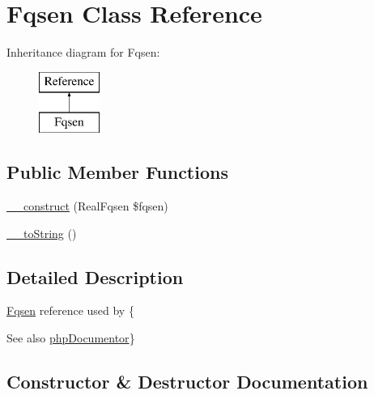\hypertarget{classphp_documentor_1_1_reflection_1_1_doc_block_1_1_tags_1_1_reference_1_1_fqsen}{}\section{Fqsen Class Reference}
\label{classphp_documentor_1_1_reflection_1_1_doc_block_1_1_tags_1_1_reference_1_1_fqsen}
Inheritance diagram for Fqsen\+:\begin{figure}[H]
\begin{center}
\leavevmode
\includegraphics[height=2.000000cm]{classphp_documentor_1_1_reflection_1_1_doc_block_1_1_tags_1_1_reference_1_1_fqsen}
\end{center}
\end{figure}
\subsection*{Public Member Functions}
\begin{DoxyCompactItemize}
\item 
\mbox{\hyperlink{classphp_documentor_1_1_reflection_1_1_doc_block_1_1_tags_1_1_reference_1_1_fqsen_a370f3f39c750420fd588d8aa7270299d}{\+\_\+\+\_\+construct}} (Real\+Fqsen \$fqsen)
\item 
\mbox{\hyperlink{classphp_documentor_1_1_reflection_1_1_doc_block_1_1_tags_1_1_reference_1_1_fqsen_a7516ca30af0db3cdbf9a7739b48ce91d}{\+\_\+\+\_\+to\+String}} ()
\end{DoxyCompactItemize}


\subsection{Detailed Description}
\mbox{\hyperlink{classphp_documentor_1_1_reflection_1_1_doc_block_1_1_tags_1_1_reference_1_1_fqsen}{Fqsen}} reference used by \{\begin{DoxySeeAlso}{See also}
\mbox{\hyperlink{namespacephp_documentor}{php\+Documentor}}\} 
\end{DoxySeeAlso}


\subsection{Constructor \& Destructor Documentation}
\mbox{\label{classphp_documentor_1_1_reflection_1_1_doc_block_1_1_tags_1_1_reference_1_1_fqsen_a370f3f39c750420fd588d8aa7270299d}} 
